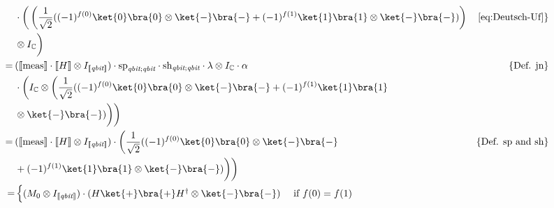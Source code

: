 \begin{align*}
   \hspace{-25pt}& \cdot  \bigg( \left(\frac{1}{\sqrt{2}}( (-1)^{f(0)} \ket{0} \bra{0} \otimes \ket{-} \bra{-} + (-1)^{f(1)} \ket{1} \bra{1} \otimes \ket{-}\bra{-}) \right) & \text{\autoref{eq:Deutsch-Uf}}\}  \\
   & \otimes  I_{\mathbb{C}} \bigg) \\
   =  \hspace{2pt} &  (\llbracket \text{meas} \rrbracket \cdot \llbracket H \rrbracket   \otimes I_{\llbracket \textit{qbit} \rrbracket} ) \cdot \text{sp}_{\textit{qbit};\textit{qbit}} \cdot \text{sh}_{\textit{qbit};\textit{qbit}} \cdot \lambda \otimes I_{\mathbb{C}} \cdot \alpha  & \{ \text{Def. jn} \}\\
   & \cdot \bigg( I_{\mathbb{C}} \otimes  \bigg(\frac{1}{\sqrt{2}}( (-1)^{f(0)} \ket{0} \bra{0} \otimes \ket{-} \bra{-} + (-1)^{f(1)} \ket{1} \bra{1}  \\
   & \otimes \ket{-}\bra{-}) \bigg) \bigg) \\  
   =  \hspace{2pt} &  (\llbracket \text{meas} \rrbracket \cdot \llbracket H \rrbracket   \otimes I_{\llbracket \textit{qbit} \rrbracket} ) \cdot \bigg(\frac{1}{\sqrt{2}}( (-1)^{f(0)} \ket{0} \bra{0} \otimes \ket{-} \bra{-} &  \{\text{Def. sp and sh} \} \\
   & + (-1)^{f(1)} \ket{1} \bra{1} \otimes \ket{-}\bra{-}) \bigg) \bigg) \\
   \hspace{2pt} = & \begin{cases}
    (M_0 \otimes I_{\llbracket \textit{qbit} \rrbracket}) \cdot (H\ket{+} \bra{+}H^\dag \otimes \ket{-}\bra{-})   &\text{ if }   f(0)= f(1) \\

\end{cases}
\end{align*}

